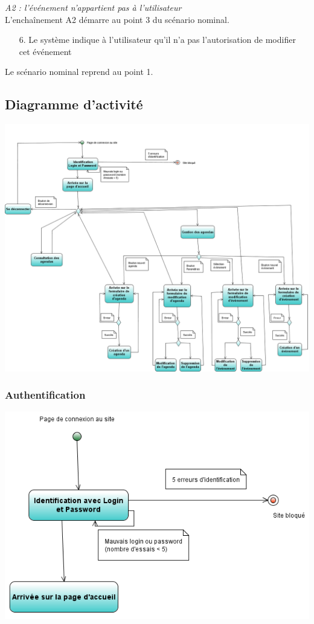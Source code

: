 \documentclass[12pt , a4paper]{article}
\begin{document}
\noindent\textit{A2 : l’événement n’appartient pas à l’utilisateur}\\
L'encha\^inement A2 démarre au point 3 du scénario nominal.
\begin{enumerate}
\item[6.] Le système indique à l’utilisateur qu’il n’a pas l’autorisation de modifier cet événement
\end{enumerate}
Le scénario nominal reprend au point 1.\\

\begin{landscape}
\subsection{Diagramme d'activité}
\begin{center}
  \includegraphics[scale=0.45]{./images/diag_activite.png}
\end{center}
\end{landscape}

\subsubsection{Authentification}
\begin{center}
  \includegraphics[scale=0.6]{./images/diag_act_authentification.png}
\end{center}
\end{document}
